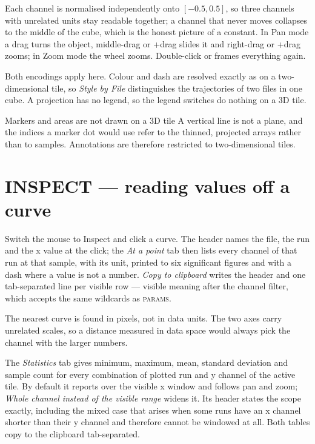 \documentclass[11pt,a4paper,oneside]{report}
\newcommand{\key}[1]{\textsf{\small\fbox{#1}}}
\newcommand{\tab}[1]{\textsc{#1}}
\begin{document}
Each channel is normalised independently onto $[-0.5, 0.5]$, so three channels
with unrelated units stay readable together; a channel that never moves collapses
to the middle of the cube, which is the honest picture of a constant. In Pan mode
a drag turns the object, middle-drag or \key{Shift}+drag slides it and
right-drag or \key{Ctrl}+drag zooms; in Zoom mode the wheel zooms. Double-click
or \key{Ctrl+0} frames everything again.

Both encodings apply here. Colour and dash are resolved exactly as on a
two-dimensional tile, so \emph{Style by File} distinguishes the trajectories of
two files in one cube. A projection has no legend, so the legend switches do
nothing on a 3D tile.

\begin{aoelimit}{Markers and areas are not drawn on a 3D tile}
A vertical line is not a plane, and the indices a marker dot would use refer to
the thinned, projected arrays rather than to samples. Annotations are therefore
restricted to two-dimensional tiles.
\end{aoelimit}

\section{INSPECT --- reading values off a curve}

Switch the mouse to Inspect and click a curve. The header names the file, the run
and the x value at the click; the \emph{At a point} tab then lists every channel
of that run at that sample, with its unit, printed to six significant figures and
with a dash where a value is not a number. \emph{Copy to clipboard} writes the
header and one tab-separated line per visible row --- visible meaning after the
channel filter, which accepts the same wildcards as \tab{params}.

The nearest curve is found in pixels, not in data units. The two axes carry
unrelated scales, so a distance measured in data space would always pick the
channel with the larger numbers.

The \emph{Statistics} tab gives minimum, maximum, mean, standard deviation and
sample count for every combination of plotted run and y channel of the active
tile. By default it reports over the visible x window and follows pan and zoom;
\emph{Whole channel instead of the visible range} widens it. Its header states
the scope exactly, including the mixed case that arises when some runs have an x
channel shorter than their y channel and therefore cannot be windowed at all.
Both tables copy to the clipboard tab-separated.
\end{document}
